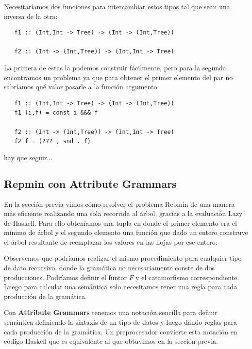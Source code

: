 \documentclass[a4paper,10pt]{article}
\begin{document}
  Necesitaríamos dos funciones para intercambiar estos tipos tal que sean una inversa de la otra:
  
  \begin{lstlisting}
   f1 :: (Int,Int -> Tree) -> (Int -> (Int,Tree))
   
   f2 :: (Int -> (Int,Tree)) -> (Int,Int -> Tree)
  \end{lstlisting}

  La primera de estas la podemos construir fácilmente, pero para la segunda encontramos un problema
  ya que para obtener el primer elemento del par no sabríamos qué valor pasarle a la función argumento:
    
  \begin{lstlisting}
   f1 :: (Int,Int -> Tree) -> (Int -> (Int,Tree))
   f1 (i,f) = const i &&& f

   f2 :: (Int -> (Int,Tree)) -> (Int,Int -> Tree)
   f2 f = (??? , snd . f)
  \end{lstlisting}

  hay que seguir...
 
  
  




\subsection{Repmin con Attribute Grammars}

  En la sección previa vimos cómo resolver el problema Repmin de una manera más eficiente realizando
  una sola recorrida al árbol, gracias a la evaluación Lazy de Haskell. Para ello obteníamos
  una tupla en donde el primer elemento era el mínimo de árbol y el segundo elemento una función
  que dado un entero construye el árbol resultante de reemplazar los valores en las hojas por ese entero.
  
  Observemos que podríamos realizar el mismo procedimiento para cualquier tipo de dato recursivo, donde
  la gramática no necesariamente conste de dos producciones. Podríamos definir el funtor $F$ 
  y el catamorfismo correspondiente. Luego para calcular una semántica solo necesitamos tener una regla
  para cada producción de la gramática.
  
  Con \textbf{Attribute Grammars} tenemos una notación sencilla para definir semántica definiendo la sintaxis
  de un tipo de datos y luego dando reglas para cada producción de la gramática. Un preprocesador
  convierte esta notación en código Haskell que es equivalente al que obtuvimos en la sección previa.
  
\end{document}

